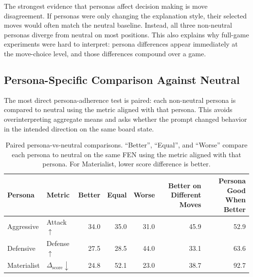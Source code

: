 \documentclass[10pt]{article}
\begin{document}
The strongest evidence that personas affect decision making is move disagreement. If personas were only changing the explanation style, their selected moves would often match the neutral baseline. Instead, all three non-neutral personas diverge from neutral on most positions. This also explains why full-game experiments were hard to interpret: persona differences appear immediately at the move-choice level, and those differences compound over a game.

\FloatBarrier

\subsection{Persona-Specific Comparison Against Neutral}

The most direct persona-adherence test is paired: each non-neutral persona is compared to neutral using the metric aligned with that persona. This avoids overinterpreting aggregate means and asks whether the prompt changed behavior in the intended direction on the same board state.

\begin{table}[!htbp]
\centering
\small
\begin{tabular}{llrrrrr}
\toprule
Persona & Metric & Better & Equal & Worse & Better on Different Moves & Persona Good When Better\\
\midrule
Aggressive & Attack $\uparrow$ & 34.0 & 35.0 & 31.0 & 45.9 & 52.9\\
Defensive & Defense $\uparrow$ & 27.5 & 28.5 & 44.0 & 33.1 & 63.6\\
Materialist & $\Delta_{\text{score}} \downarrow$ & 24.8 & 52.1 & 23.0 & 38.7 & 92.7\\
\bottomrule
\end{tabular}
\caption{Paired persona-vs-neutral comparisons. ``Better'', ``Equal'', and ``Worse'' compare each persona to neutral on the same FEN using the metric aligned with that persona. For Materialist, lower score difference is better.}
\label{tab:paired}
\end{table}
\end{document}
